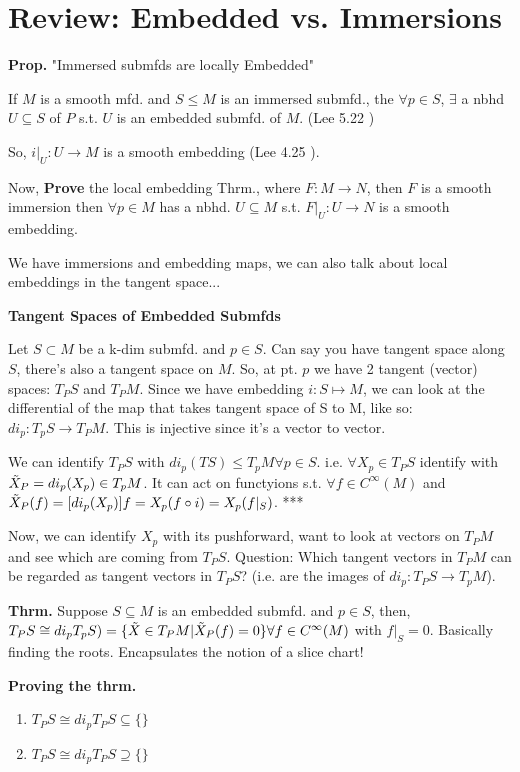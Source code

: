 \documentclass[12pt,letterpaper]{article}
\begin{document}
\section*{Review: Embedded vs. Immersions}
\textbf{Prop.} "Immersed submfds are locally Embedded"

If $M$ is a smooth mfd. and $S \leq M$ is an immersed submfd., the $\forall p \in S$, $\exists$ a nbhd $U \subseteq S$ of $P$ s.t. $U$ is an embedded submfd. of $M$. (Lee 5.22 )

So, $i|_U: U \rightarrow M$ is a smooth embedding (Lee 4.25 ). 

Now, \textbf{Prove} the local embedding Thrm., where $F:M \rightarrow N$, then $F$ is a smooth immersion then $\forall p \in M$ has a nbhd. $U \subseteq M$ s.t. $F|_U : U \rightarrow N$ is a smooth embedding. 

We have immersions and embedding maps, we can also talk about local embeddings in the tangent space...

\textbf{Tangent Spaces of Embedded Submfds}

Let $S \subset M$ be a k-dim submfd. and $p \in S$. Can say you have tangent space along $S$, there's also a tangent space on $M$. So, at pt. $p$ we have 2 tangent (vector) spaces: $T_P S$ and $T_P M$. Since we have embedding $i: S \mapsto M$, we can look at the differential of the map that takes tangent space of S to M, like so: $di_p : T_p S \rightarrow T_P M$. This is injective since it's a vector to vector.

We can identify $T_P S$ with $di_p (TS) \leq T_p M \forall p \in S$. i.e. $\forall X_p \in T_P S$ identify with $\Tilde{X}_P = di_p (X_p) \in T_p M$. It can act on functyions s.t. $\forall f \in C^{\infty} (M) $ and $\Tilde{X}_P(f) = [ di_p (X_p)]f = X_p (f \circ i ) = X_p (f|_S)$. ***

Now, we can identify $X_p$ with its pushforward, want to look at vectors on $T_P M$ and see which are coming from $T_P S$. Question: Which tangent vectors in $T_P M$ can be regarded as tangent vectors in $T_P S$? (i.e. are the images of $di_p: T_P S \rightarrow T_p M$).

\textbf{Thrm.} Suppose $S \subseteq M$ is an embedded submfd. and $p \in S$, then, $T_P S \cong di_p T_p S) = \{ \Tilde{X} \in T_P M | \Tilde{X}_P (f) = 0\} \forall f \in C^{\infty}(M)$ with $f|_S = 0$. Basically finding the roots. Encapsulates the notion of a slice chart!

\textbf{Proving the thrm.} 
\begin{enumerate}
    \item $T_P S \cong di_p T_P S \subseteq \{ \}$
    \item $T_P S \cong di_p T_P S \supseteq \{ \}$
\end{enumerate}
\end{document}
